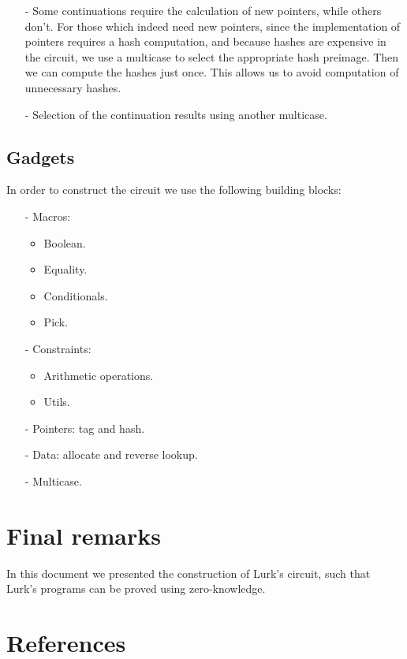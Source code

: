 \documentclass[10pt, english]{article}
\begin{document}
\begin{itemize}
	\item[-] Some continuations require the calculation of new pointers, while others don't. For those which indeed need new pointers, since the implementation of pointers requires a hash computation, and because hashes are expensive in the circuit, we use a multicase to select the appropriate hash preimage. Then we can compute the hashes just once. This allows us to avoid computation of unnecessary hashes.
	\item[-] Selection of the continuation results using another multicase.
\end{itemize}

\subsection{Gadgets}

In order to construct the circuit we use the following building blocks:

\begin{itemize}
	\item[-] Macros:
	\begin{itemize}
		\item Boolean.
	    \item Equality.
		\item Conditionals.
		\item Pick.
	\end{itemize}
	\item[-] Constraints:
	\begin{itemize}
        \item Arithmetic operations.
		\item Utils.
	\end{itemize}
	\item[-] Pointers: tag and hash.
    \item[-] Data: allocate and reverse lookup.
    \item[-] Multicase.
\end{itemize}

\section{Final remarks}

In this document we presented the construction of Lurk's circuit, such that Lurk's programs can be proved using zero-knowledge.

\section{References}




\end{document}
